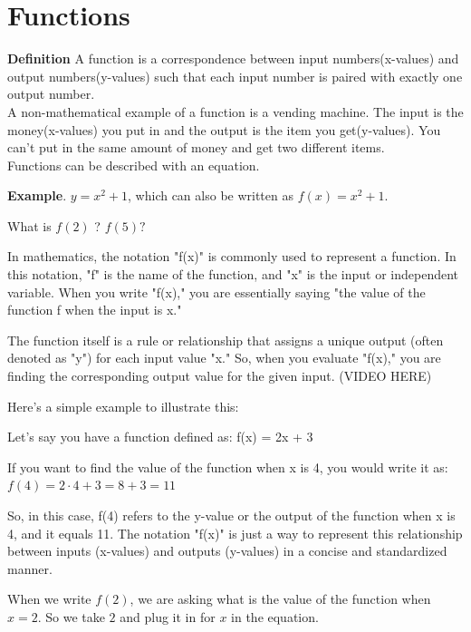 \section{Functions}
\textbf{Definition} A function is a correspondence between input numbers(x-values) and output numbers(y-values) such that each input number is paired with exactly one output number. \\
A non-mathematical example of a function is a vending machine. The input is the money(x-values) you put in and the output is the item you get(y-values). You can't put in the same amount of money and get two different items. \\

Functions can be described with an equation.

\textbf{Example}. $y = x^2 + 1$, which can also be written as $f(x) = x^2 + 1$. \\
\vspace{4pt}

What is $f(2)$ ? $ f(5) ?$ \\
\vspace{4pt}

In mathematics, the notation "f(x)" is commonly used to represent a function. In this notation, "f" is the name of the function, and "x" is the input or independent variable. When you write "f(x)," you are essentially saying "the value of the function f when the input is x."

The function itself is a rule or relationship that assigns a unique output (often denoted as "y") for each input value "x." So, when you evaluate "f(x)," you are finding the corresponding output value for the given input. (VIDEO HERE)

Here's a simple example to illustrate this:

Let's say you have a function defined as:
f(x) = 2x + 3

If you want to find the value of the function when x is 4, you would write it as:
$f(4) = 2 \cdot 4 + 3 = 8 + 3 = 11$

So, in this case, f(4) refers to the y-value or the output of the function when x is 4, and it equals 11. The notation "f(x)" is just a way to represent this relationship between inputs (x-values) and outputs (y-values) in a concise and standardized manner.

When we write $f(2)$, we are asking what is the value of the function when $x = 2$. 
So we take $2$ and plug it in for $x$ in the equation. \\


